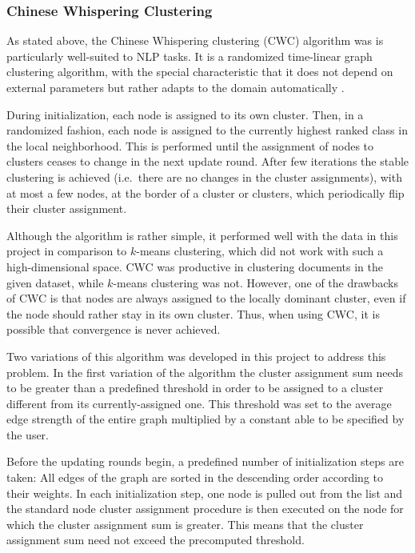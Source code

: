 \subsubsection{Chinese Whispering Clustering}
\label{sec:chinese_whipsering_clustering}
As stated above, the Chinese Whispering clustering (CWC) algorithm was is particularly well-suited to NLP tasks. It is a
randomized time-linear graph clustering algorithm, with the special characteristic that it does not depend
on external parameters but rather adapts to the domain automatically \cite{cw_clustering}.

During initialization, each node is assigned to its own cluster. Then, in a randomized
fashion, each node is assigned to the currently highest ranked class in the local neighborhood. This is performed until the assignment of nodes to clusters ceases to change in the next update round. After few iterations the stable clustering is achieved (i.e.\ there are no changes in the cluster
assignments), with at most a few nodes, at the border of a cluster or clusters, which periodically flip their
cluster assignment.

Although the algorithm is rather simple, it performed well with the data in this project in comparison to $k$-means clustering, which did not work with such a high-dimensional space. CWC was productive in clustering documents in the given dataset, while $k$-means clustering was not. However, one of the drawbacks of CWC is that nodes are always assigned to the locally dominant cluster, even if the node should rather stay in its own cluster. Thus, when using CWC, it is possible that convergence is never achieved.

Two variations of this algorithm was developed in this project to address this problem.
In the first variation of the algorithm the cluster assignment sum needs to be greater than a predefined threshold in order to be assigned to a cluster different from its currently-assigned one. This threshold was set to the average edge strength of the entire graph multiplied by a constant able to be specified by the user.

Before the updating rounds begin, a predefined number of initialization steps are taken: All edges of the graph are sorted in the descending order according to
their weights. In each initialization step, one node is pulled out from the list and the standard
node cluster assignment procedure is then executed on the node for which the cluster assignment sum
is greater. This means that the cluster assignment sum need not exceed the precomputed threshold.

